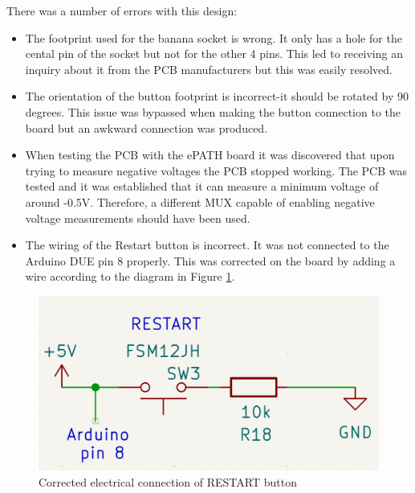 There was a number of errors with this design:
\begin{itemize}
\item The footprint used for the banana socket is wrong. It only has a hole for the cental pin of the socket but not for the other 4 pins. This led to receiving an inquiry about it from the PCB manufacturers but this was easily resolved.
\item The orientation of the button footprint is incorrect-it should be rotated by 90 degrees. This issue was bypassed when making the button connection to the board but an awkward connection was produced.
\item When testing the PCB with the ePATH board it was discovered that upon trying to measure negative voltages the PCB stopped working. The PCB was tested and it was established that it can measure a minimum voltage of around -0.5V. Therefore, a different MUX capable of enabling negative voltage measurements should have been used.
\item The wiring of the Restart button is incorrect. It was not connected to the Arduino DUE pin 8 properly. This was corrected on the board by adding a wire according to the diagram in Figure \ref{button_wiring}.
\end{itemize}

\begin{figure}[H]
          \centering
          \includegraphics[width=1\linewidth]{img/button_wiring.png}
          \caption{Corrected electrical connection of RESTART button}
          \label{button_wiring}
    \end{figure}



